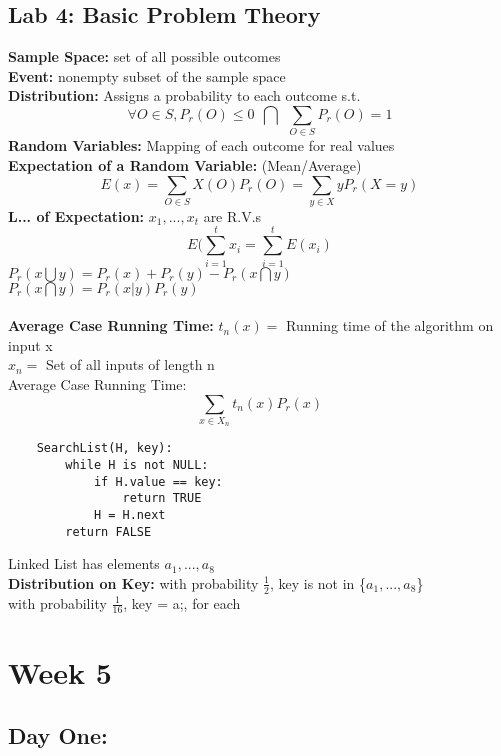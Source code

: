 \documentclass{article}
\begin{document}
	\subsection{Lab 4: Basic Problem Theory}
	\textbf{Sample Space: }set of all possible outcomes\\
	\textbf{Event: }nonempty subset of the sample space\\
	\textbf{Distribution: }Assigns a probability to each outcome s.t. $$\forall O\in S, P_r (O) \le 0 ~~\bigcap~~ \sum_{O\in S} P_r (O) = 1$$
	\textbf{Random Variables: }Mapping of each outcome for real values\\
	\textbf{Expectation of a Random Variable: }(Mean/Average) $$E(x)=\sum_{O\in S} X(O) P_r(O) = \sum_{y\in X} yP_r(X=y)$$
	\textbf{L... of Expectation: } $x_1,...,x_t$ are R.V.s $$E(\sum_{i=1}^{t} x_i = \sum_{i=1}^{t} E(x_i)$$
	$P_r(x\bigcup y) = P_r(x) + P_r(y) - P_r(x\bigcap y)$\\
	$P_r(x\bigcap y) = P_r(x|y)P_r(y)$\\\\
	\textbf{Average Case Running Time: }$t_n(x) =$ Running time of the algorithm on input x\\
	$x_n=$ Set of all inputs of length n\\
	Average Case Running Time: $$\sum_{x\in X_n} t_n(x)P_r(x)$$
	\begin{lstlisting}
	SearchList(H, key):
		while H is not NULL:
			if H.value == key:
				return TRUE
			H = H.next
		return FALSE
	\end{lstlisting}
	Linked List has elements $a_1,...,a_8$\\
	\textbf{Distribution on Key: }with probability $\frac{1}{2}$, key is not in \{$a_1,...,a_8$\}\\
	with probability $\frac{1}{16}$, key = a;, for each\\
	\section{Week 5}
	\subsection{Day One: \\\\}
\end{document}
